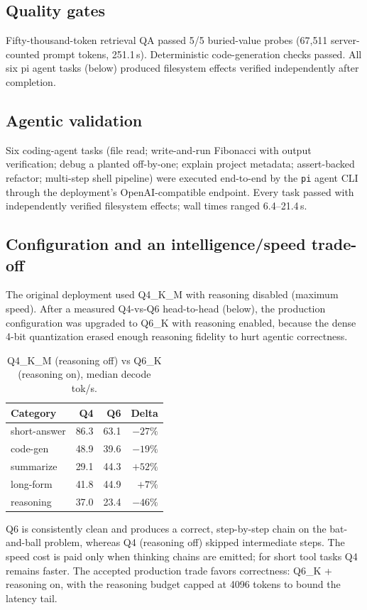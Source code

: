 \documentclass[11pt]{article}
\begin{document}
\subsection{Quality gates}
Fifty-thousand-token retrieval QA passed 5/5 buried-value probes (67{,}511
server-counted prompt tokens, 251.1\,s). Deterministic code-generation checks
passed. All six pi agent tasks (below) produced filesystem effects verified
independently after completion.

\subsection{Agentic validation}
Six coding-agent tasks (file read; write-and-run Fibonacci with output
verification; debug a planted off-by-one; explain project metadata;
assert-backed refactor; multi-step shell pipeline) were executed end-to-end by
the \texttt{pi} agent CLI through the deployment's OpenAI-compatible endpoint.
Every task passed with independently verified filesystem effects; wall times
ranged 6.4--21.4\,s.

\subsection{Configuration and an intelligence/speed trade-off}

The original deployment used Q4\_K\_M with reasoning disabled (maximum speed).
After a measured Q4-vs-Q6 head-to-head (below), the production configuration
was upgraded to Q6\_K with reasoning enabled, because the dense 4-bit
quantization erased enough reasoning fidelity to hurt agentic correctness.

\begin{table}[h]
\centering
\caption{Q4\_K\_M (reasoning off) vs Q6\_K (reasoning on), median decode tok/s.}
\label{tab:quant}
\begin{tabular}{lrrr}
\toprule
Category & Q4 & Q6 & Delta \\
\midrule
short-answer & 86.3 & 63.1 & $-27\%$ \\
code-gen     & 48.9 & 39.6 & $-19\%$ \\
summarize    & 29.1 & 44.3 & $+52\%$ \\
long-form    & 41.8 & 44.9 & $+7\%$ \\
reasoning    & 37.0 & 23.4 & $-46\%$ \\
\bottomrule
\end{tabular}
\end{table}

Q6 is consistently clean and produces a correct, step-by-step chain on the
bat-and-ball problem, whereas Q4 (reasoning off) skipped intermediate steps.
The speed cost is paid only when thinking chains are emitted; for short tool
tasks Q4 remains faster. The accepted production trade favors correctness:
Q6\_K + reasoning on, with the reasoning budget capped at 4096 tokens to bound
the latency tail.
\end{document}
